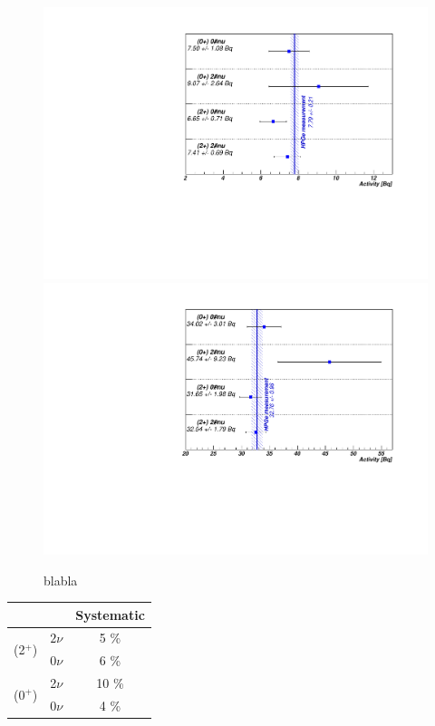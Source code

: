 \documentclass[main.tex]{subfiles}
\begin{document}
\begin{figure} [h!]
\begin{center}
\includegraphics[scale=0.6]{pictures/Chap6/ComparisonChannelSource1AllES.pdf}
\includegraphics[scale=0.6]{pictures/Chap6/ComparisonChannelSource3AllES.pdf}
\end{center}
\caption{blabla}
\label{plot:ComparisionSourcesHPGe}
\end{figure}


\begin{table}
\centering
\begin{tabular}{cc|c}
& & Systematic \\
\toprule
\multirow{2}{*}{(2$^+$)} & $2\nu$ & 5 \% \\
                         & $0\nu$ & 6 \% \\ 
\midrule
\multirow{2}{*}{(0$^+$)} & 2$\nu$ & 10 \% \\
                         & 0$\nu$ & 4 \% \\ 
\bottomrule
\end{tabular}
\end{table}
\end{document}
